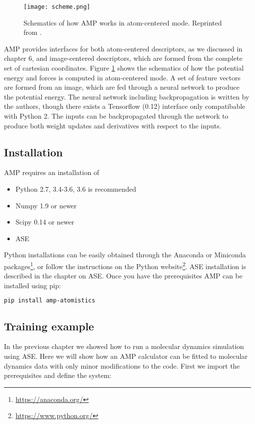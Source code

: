 \begin{figure}[h]
\centering
\texttt{[image: scheme.png]}
\caption{Schematics of how AMP works in atom-centered mode.
    Reprinted from \parencite[AMP paper]{khorshidi2016amp}.}
\label{fig:scheme}
\end{figure}

AMP provides interfaces for both atom-centered descriptors, as we
discussed in chapter 6, and image-centered descriptors,
which are formed from the complete set of cartesian coordinates.
Figure \ref{fig:scheme} shows the schematics of how the
potential energy and forces is computed in atom-centered mode.
A set of feature vectors are formed from an image, which are fed
through a neural network to produce the potential energy.
The neural network including backpropagation is written by the
authors, though there exists a Tensorflow (0.12) interface
only compatibable with Python 2.
The inputs can be backpropagated through the network
to produce both weight updates and derivatives with respect to
the inputs.

\subsection{Installation}
AMP requires an installation of

\begin{itemize}
    \item Python 2.7, 3.4-3.6, 3.6 is recommended
    \item Numpy 1.9 or newer
    \item Scipy 0.14 or newer
    \item ASE
\end{itemize}

Python installations can be easily obtained through the Anaconda 
or Miniconda packages\footnote{\url{https://anaconda.org/}},
or follow the instructions on the Python website\footnote{
\url{https://www.python.org/}}.
ASE installation is described in the chapter on ASE.
Once you have the prerequisites AMP can be installed using pip:

\begin{lstlisting}[language=bash]
pip install amp-atomistics
\end{lstlisting}

\subsection{Training example}
In the previous chapter we showed how to run a molecular dynamics
simulation using ASE. Here we will show how an AMP calculator
can be fitted to molecular dynamics data with only minor
modifications to the code.
First we import the prerequisites and define the system:

